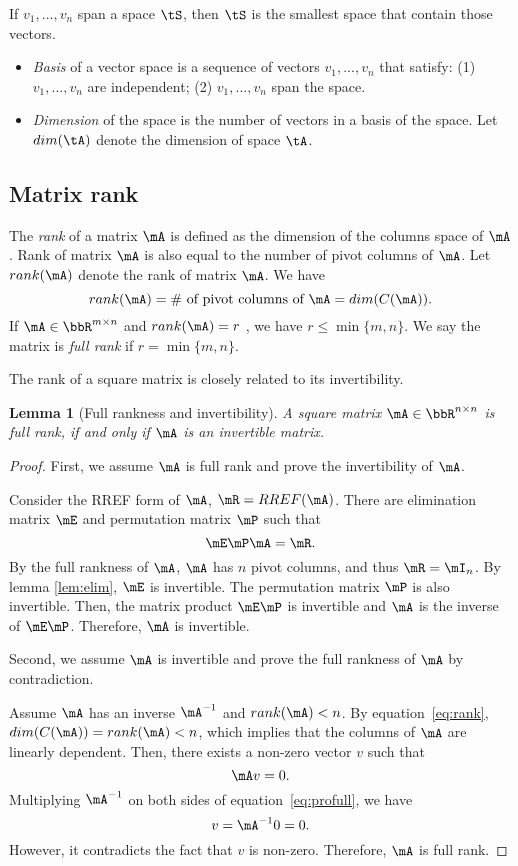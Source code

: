 \documentclass[11pt]{article}
\theoremstyle{plain}
\newtheorem{lem}{Lemma}
\theoremstyle{definition}
\begin{document}
If  $v_1 ,...,v_n$ span a space $\tS$, then $\tS$ is the smallest space that contain those vectors.

\begin{itemize}
	\item \textit{Basis} of a vector space is a sequence of vectors $v_1 ,...,v_n$ that satisfy: (1) $v_1 ,...,v_n$ are independent; (2) $v_1 ,...,v_n$ span the space.
	\item \textit{Dimension} of the space is the number of vectors in a basis of the space. Let $dim(\tA)$ denote the dimension of space $\tA$.
\end{itemize}

\subsection{Matrix rank}
The \textit{rank} of a matrix $\mA$ is defined as the dimension of the columns space of $\mA$. Rank of matrix $\mA$ is also equal to the number of pivot columns of $\mA$. Let $rank(\mA)$ denote the rank of matrix $\mA$. We have
\begin{equation}\label{eq:rank}
	rank(\mA) = \# \text{ of pivot columns of }\mA = dim(C(\mA)).
\end{equation}
If $\mA\in \bbR^{m \times n}$ and $rank(\mA) = r$ , we have $r \leq \min\{m,n\} $. We say the matrix is \textit{full rank} if $r = \min\{m,n\}$.

\vspace{.2cm}
The rank of a square matrix is closely related to its invertibility. 
\begin{lem}[Full rankness and invertibility]\label{lem:fullrank} A square matrix $\mA \in \bbR^{n \times n}$ is full rank, if and only if $\mA$ is an invertible matrix.
\end{lem}

\begin{proof}
	First, we assume $\mA$ is full rank and prove the invertibility of $\mA$.
	
	Consider the RREF form of $\mA$, $\mR = RREF(\mA)$. There are elimination matrix $\mE$ and permutation matrix $\mP$ such that
	\[ \mE \mP \mA =  \mR. \]
	By the full rankness of $\mA$,  $\mA$ has $n$ pivot columns, and thus $\mR = \mI_n$. By lemma \ref{lem:elim}, $\mE$ is invertible. The permutation matrix $\mP$ is also invertible. Then, the matrix product $\mE \mP$ is invertible and $\mA$ is the inverse of $\mE \mP$. Therefore, $\mA$ is invertible.
	
	Second, we assume $\mA$ is invertible and prove the full rankness of $\mA$ by contradiction. 
	
  Assume $\mA$ has an inverse $\mA^{-1}$ and $rank(\mA) < n$. By equation~\eqref{eq:rank}, $dim(C(\mA)) = rank(\mA)<n$, which implies that the columns of $\mA$ are linearly dependent. Then, there exists a non-zero vector $v$ such that 
  \begin{equation}\label{eq:profull}
  	\mA v = 0.
  \end{equation}
Multiplying $\mA^{-1}$ on both sides of equation~\eqref{eq:profull}, we have \[ v = \mA^{-1} 0 = 0.\] However, it contradicts the fact that $v$ is non-zero. Therefore, $\mA$ is full rank.
\end{proof}
\end{document}
